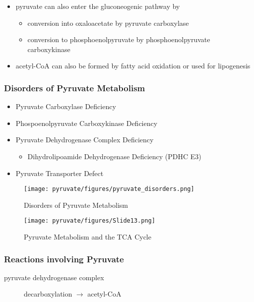 \documentclass{scrartcl}
\begin{document}
\begin{itemize}
\item pyruvate can also enter the gluconeogenic pathway by
\begin{itemize}
\item conversion into oxaloacetate by pyruvate carboxylase
\item conversion to phosphoenolpyruvate by phosphoenolpyruvate carboxykinase
\end{itemize}
\item acetyl-CoA can also be formed by fatty acid oxidation or used for
lipogenesis
\end{itemize}


\subsubsection{Disorders of Pyruvate Metabolism}
\label{sec:orge60e087}
\begin{itemize}
\item Pyruvate Carboxylase Deficiency
\item Phospoenolpyruvate Carboxykinase Deficiency
\item Pyruvate Dehydrogenase Complex Deficiency
\begin{itemize}
\item Dihydrolipoamide Dehydrogenase Deficiency (PDHC E3)
\end{itemize}
\item Pyruvate Transporter Defect
\end{itemize}

\begin{figure}[htbp]
\centering
\texttt{[image: pyruvate/figures/pyruvate\_disorders.png]}
\caption[TCA]{\label{fig:org06fd5dc}Disorders of Pyruvate Metabolism}
\end{figure}


\begin{figure}[htbp]
\centering
\texttt{[image: pyruvate/figures/Slide13.png]}
\caption[TCA]{\label{fig:org0ff05c3}Pyruvate Metabolism and the TCA Cycle}
\end{figure}

\subsubsection{Reactions involving Pyruvate}
\label{sec:org1b7e4a5}

\begin{description}
\item[{pyruvate dehydrogenase complex}] decarboxylation \(\to\) acetyl-CoA
\end{description}
\end{document}
